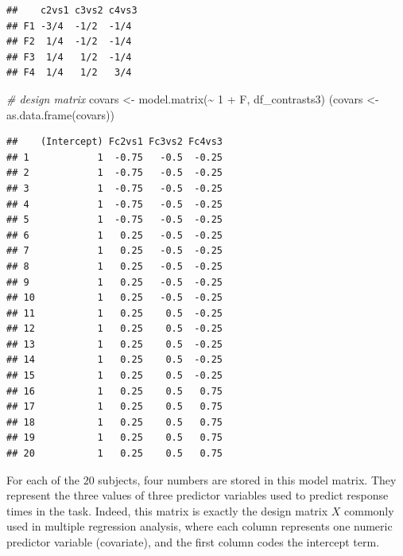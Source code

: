 \documentclass[
  12pt,
]{krantz}
\newenvironment{Shaded}{\begin{snugshade}}{\end{snugshade}}
\newcommand{\CommentTok}[1]{\textcolor[rgb]{0.56,0.35,0.01}{\textit{#1}}}
\newcommand{\DecValTok}[1]{\textcolor[rgb]{0.00,0.00,0.81}{#1}}
\newcommand{\FunctionTok}[1]{\textcolor[rgb]{0.00,0.00,0.00}{#1}}
\newcommand{\NormalTok}[1]{#1}
\newcommand{\OtherTok}[1]{\textcolor[rgb]{0.56,0.35,0.01}{#1}}
\newcommand{\SpecialCharTok}[1]{\textcolor[rgb]{0.00,0.00,0.00}{#1}}
\theoremstyle{definition}
\theoremstyle{definition}
\theoremstyle{definition}
\theoremstyle{definition}
\theoremstyle{remark}
\begin{document}
\begin{Shaded}
\end{Shaded}

\begin{verbatim}
##    c2vs1 c3vs2 c4vs3
## F1 -3/4  -1/2  -1/4 
## F2  1/4  -1/2  -1/4 
## F3  1/4   1/2  -1/4 
## F4  1/4   1/2   3/4
\end{verbatim}

\begin{Shaded}
\begin{Highlighting}[]
\CommentTok{\# design matrix}
\NormalTok{covars }\OtherTok{\textless{}{-}} \FunctionTok{model.matrix}\NormalTok{(}\SpecialCharTok{\textasciitilde{}} \DecValTok{1} \SpecialCharTok{+}\NormalTok{ F, df\_contrasts3)}
\NormalTok{(covars }\OtherTok{\textless{}{-}} \FunctionTok{as.data.frame}\NormalTok{(covars))}
\end{Highlighting}
\end{Shaded}

\begin{verbatim}
##    (Intercept) Fc2vs1 Fc3vs2 Fc4vs3
## 1            1  -0.75   -0.5  -0.25
## 2            1  -0.75   -0.5  -0.25
## 3            1  -0.75   -0.5  -0.25
## 4            1  -0.75   -0.5  -0.25
## 5            1  -0.75   -0.5  -0.25
## 6            1   0.25   -0.5  -0.25
## 7            1   0.25   -0.5  -0.25
## 8            1   0.25   -0.5  -0.25
## 9            1   0.25   -0.5  -0.25
## 10           1   0.25   -0.5  -0.25
## 11           1   0.25    0.5  -0.25
## 12           1   0.25    0.5  -0.25
## 13           1   0.25    0.5  -0.25
## 14           1   0.25    0.5  -0.25
## 15           1   0.25    0.5  -0.25
## 16           1   0.25    0.5   0.75
## 17           1   0.25    0.5   0.75
## 18           1   0.25    0.5   0.75
## 19           1   0.25    0.5   0.75
## 20           1   0.25    0.5   0.75
\end{verbatim}

For each of the \(20\) subjects, four numbers are stored in this model matrix. They represent the three values of three predictor variables used to predict response times in the task. Indeed, this matrix is exactly the design matrix \(X\) commonly used in multiple regression analysis, where each column represents one numeric predictor variable (covariate), and the first column codes the intercept term.
\end{document}
